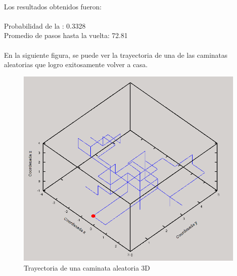\documentclass[a4paper,10pt]{article}
\begin{document}
\\ Los resultados obtenidos fueron:
\\
\\ Probabilidad de la : 0.3328 
\\ Promedio de pasos hasta la vuelta: 72.81
\\
\\ En la siguiente figura, se puede ver la trayectoria de una de las caminatas aleatorias que logro exitosamente volver a casa.
\begin{center}
  \begin{figure}[H]
  \includegraphics[scale=0.5]{./images/rec3edit.png}
    \caption{Trayectoria de una caminata aleatoria 3D}
  \end{figure}
\end{center} 

\newpage
\end{document}
